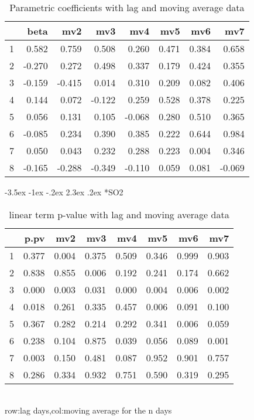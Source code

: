 \documentclass[a4paper, 12pt]{article}
\makeatletter
\def\large{\fontsize{14}{20}\selectfont}
\renewcommand\subsection{\@startsection {subsection}{1}{\z@}%
                                   {-3.5ex \@plus -1ex \@minus -.2ex}%
                                   {2.3ex \@plus.2ex}%
                                   {\centering\normalfont\large\bfseries}}
\makeatother
\begin{document}
\begin{table}[h]
\centering
\caption{Parametric coefficients with lag and moving average data}
\begin{tabular}{rrrrrrrr}
  \hline
 & beta & mv2 & mv3 & mv4 & mv5 & mv6 & mv7 \\
  \hline
1 & 0.582 & 0.759 & 0.508 & 0.260 & 0.471 & 0.384 & 0.658 \\
  2 & -0.270 & 0.272 & 0.498 & 0.337 & 0.179 & 0.424 & 0.355 \\
  3 & -0.159 & -0.415 & 0.014 & 0.310 & 0.209 & 0.082 & 0.406 \\
  4 & 0.144 & 0.072 & -0.122 & 0.259 & 0.528 & 0.378 & 0.225 \\
  5 & 0.056 & 0.131 & 0.105 & -0.068 & 0.280 & 0.510 & 0.365 \\
  6 & -0.085 & 0.234 & 0.390 & 0.385 & 0.222 & 0.644 & 0.984 \\
  7 & 0.050 & 0.043 & 0.232 & 0.288 & 0.223 & 0.004 & 0.346 \\
  8 & -0.165 & -0.288 & -0.349 & -0.110 & 0.059 & 0.081 & -0.069 \\
   \hline
\end{tabular}
\end{table}
\clearpage
\subsection*{SO2}
\begin{table}[h]
\centering
\caption{linear term p-value with lag and moving average data}
\begin{tabular}{rrrrrrrr}
  \hline
 & p.pv & mv2 & mv3 & mv4 & mv5 & mv6 & mv7 \\
  \hline
1 & 0.377 & 0.004 & 0.375 & 0.509 & 0.346 & 0.999 & 0.903 \\
  2 & 0.838 & 0.855 & 0.006 & 0.192 & 0.241 & 0.174 & 0.662 \\
  3 & 0.000 & 0.003 & 0.031 & 0.000 & 0.004 & 0.006 & 0.002 \\
  4 & 0.018 & 0.261 & 0.335 & 0.457 & 0.006 & 0.091 & 0.100 \\
  5 & 0.367 & 0.282 & 0.214 & 0.292 & 0.341 & 0.006 & 0.059 \\
  6 & 0.238 & 0.104 & 0.875 & 0.039 & 0.056 & 0.089 & 0.001 \\
  7 & 0.003 & 0.150 & 0.481 & 0.087 & 0.952 & 0.901 & 0.757 \\
  8 & 0.286 & 0.334 & 0.932 & 0.751 & 0.590 & 0.319 & 0.295 \\
   \hline
\end{tabular}
\\row:lag days,col:moving average for the n days
\end{table}
\end{document}
